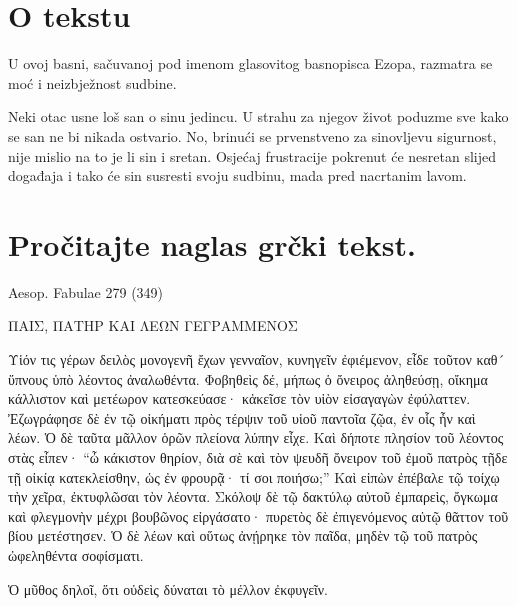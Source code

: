 


\section*{O tekstu}

U ovoj basni, sačuvanoj pod imenom glasovitog basnopisca Ezopa, razmatra se moć i neizbježnost sudbine.

Neki otac usne loš san o sinu jedincu. U strahu za njegov život poduzme sve kako se san ne bi nikada ostvario. No, brinući se prvenstveno za sinovljevu sigurnost, nije mislio na to je li sin i sretan. Osjećaj frustracije pokrenut će nesretan slijed događaja i tako će sin susresti svoju sudbinu, mada pred nacrtanim lavom.


\section*{Pročitajte naglas grčki tekst.}

Aesop. Fabulae 279 (349)


\medskip


{\large

\begin{greek}

\noindent ΠΑΙΣ, ΠΑΤΗΡ ΚΑΙ ΛΕΩΝ ΓΕΓΡΑΜΜΕΝΟΣ

\medskip

\noindent Υἱόν τις γέρων δειλὸς μονογενῆ ἔχων γενναῖον, κυνηγεῖν ἐφιέμενον, εἶδε τοῦτον καθ´ ὕπνους ὑπὸ λέοντος ἀναλωθέντα. Φοβηθεὶς δέ, μήπως ὁ ὄνειρος ἀληθεύσῃ, οἴκημα κάλλιστον καὶ μετέωρον κατεσκεύασε· κἀκεῖσε τὸν υἱὸν εἰσαγαγὼν ἐφύλαττεν. Ἐζωγράφησε δὲ ἐν τῷ οἰκήματι πρὸς τέρψιν τοῦ υἱοῦ παντοῖα ζῷα, ἐν οἷς ἦν καὶ λέων. Ὁ δὲ ταῦτα μᾶλλον ὁρῶν πλείονα λύπην εἶχε. Καὶ δήποτε πλησίον τοῦ λέοντος στὰς εἶπεν· ``ὦ κάκιστον θηρίον, διὰ σὲ καὶ τὸν ψευδῆ ὄνειρον τοῦ ἐμοῦ πατρὸς τῇδε τῇ οἰκίᾳ κατεκλείσθην, ὡς ἐν φρουρᾷ· τί σοι ποιήσω;'' Καὶ εἰπὼν ἐπέβαλε τῷ τοίχῳ τὴν χεῖρα, ἐκτυφλῶσαι τὸν λέοντα. Σκόλοψ δὲ τῷ δακτύλῳ αὐτοῦ ἐμπαρεὶς, ὄγκωμα καὶ φλεγμονὴν μέχρι βουβῶνος εἰργάσατο· πυρετὸς δὲ ἐπιγενόμενος αὐτῷ θᾶττον τοῦ βίου μετέστησεν. Ὁ δὲ λέων καὶ οὕτως ἀνῄρηκε τὸν παῖδα, μηδὲν τῷ τοῦ πατρὸς ὠφεληθέντα σοφίσματι.

Ὁ μῦθος δηλοῖ, ὅτι οὐδεὶς δύναται τὸ μέλλον ἐκφυγεῖν.

\end{greek}

}



